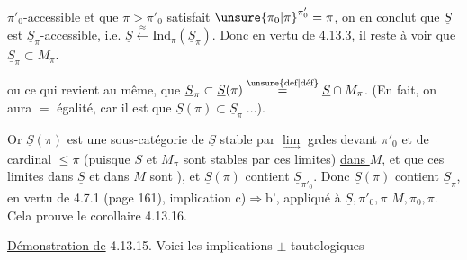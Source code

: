 
$\pi'_0$-accessible et que $\pi>\pi'_0$ satisfait $\unsure{\pi_0|\pi}^{\pi'_0}=\pi$, on en conclut que $\underline S$ est $\underline S_\pi$-accessible, i.e. $\underline S\xleftarrow{\approx}\mathrm{Ind}_\pi(\underline S_\pi)$. Donc en vertu de 4.13.3, il reste à voir que $\underline S_\pi\subset M_\pi$.

 ou ce qui revient au même, que $\underline S_\pi\subset\underline S(\pi)\overset{\text{\unsure{def|déf}}}{=}\underline S\cap M_\pi$. (En fait, on aura $=$ égalité, car il est   que $\underline S(\pi)\subset\underline S_\pi\;\ldots$).

Or $\underline S(\pi)$ est une sous-catégorie de $\underline S$ stable par $\underset{\longrightarrow}{\lim}$ grdes devant $\pi'_0$ et de cardinal $\leq\pi$ (puisque $\underline S$ et $M_\pi$ sont stables par ces limites) \uline{dans $M$}, et que ces limites dans $\underline S$ et dans \uline{$M$} sont ), et $\underline S(\pi)$ contient $\underline S_{\pi'_0}$. Donc $\underline S(\pi)$ contient $\underline S_\pi$, en vertu de 4.7.1 (page 161), implication c)$\Longrightarrow$b', appliqué à $\underline S,\pi'_0,\pi$  $M,\pi_0,\pi$. Cela prouve  le corollaire 4.13.16.

\uline{Démonstration de} 4.13.15. Voici les implications $\pm$ tautologiques


